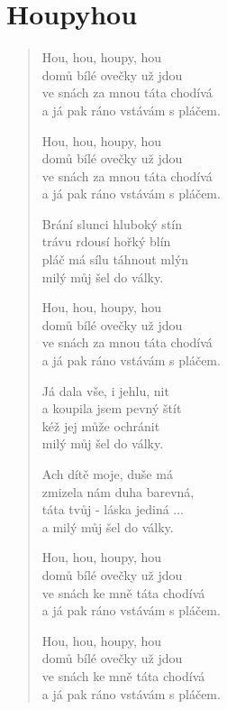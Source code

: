 \section{Houpyhou}

\begin{verse}
Hou, hou, houpy, hou \\
domů bílé ovečky už jdou \\
ve snách za mnou táta chodívá \\
a já pak ráno vstávám s pláčem.

Hou, hou, houpy, hou \\
domů bílé ovečky už jdou \\
ve snách za mnou táta chodívá \\
a já pak ráno vstávám s pláčem.

Brání slunci hluboký stín \\
trávu rdousí hořký blín \\
pláč má sílu táhnout mlýn \\
milý můj šel do války. 

Hou, hou, houpy, hou \\
domů bílé ovečky už jdou \\
ve snách za mnou táta chodívá \\
a já pak ráno vstávám s pláčem.

Já dala vše, i jehlu, nit \\
a koupila jsem pevný štít  \\
kéž jej může ochránit \\ 
milý můj šel do války. 

Ach dítě moje, duše má \\
zmizela nám duha barevná, \\
táta tvůj - láska jediná ...\\
a milý můj šel do války. 

Hou, hou, houpy, hou \\
domů bílé ovečky už jdou \\
ve snách ke mně táta chodívá \\
a já pak ráno vstávám s pláčem.

Hou, hou, houpy, hou \\
domů bílé ovečky už jdou \\
ve snách ke mně táta chodívá \\
a já pak ráno vstávám s pláčem.


\end{verse}
